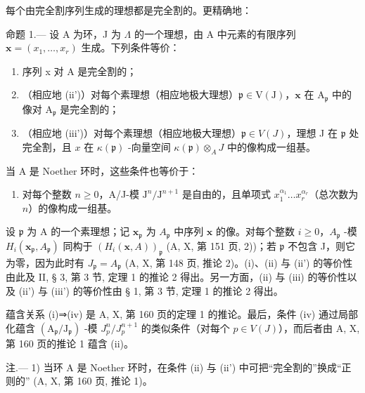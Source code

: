每个由完全割序列生成的理想都是完全割的。更精确地：

命题 1.--- 设 A 为环，J 为 \(\Lambda\) 的一个理想，由 A 中元素的有限序列 \(\mathbf{x} = (x_1, \ldots, x_r)\) 生成。下列条件等价：

\begin{enumerate}
\def\labelenumi{(\roman{enumi})}
\item
  序列 x 对 A 是完全割的；
\item
  （相应地 (ii')）对每个素理想（相应地极大理想）\(\mathfrak{p} \in \mathrm{V}(\mathrm{J})\)，\(\mathbf{x}\) 在 \(\mathrm{A}_{\mathfrak{p}}\) 中的像对 \(\mathrm{A}_{\mathfrak{p}}\) 是完全割的；
\item
  （相应地 (iii')）对每个素理想（相应地极大理想）\(\mathfrak{p} \in V(J)\)，理想 J 在 \(\mathfrak{p}\) 处完全割，且 \(x\) 在 \(\kappa(\mathfrak{p})\) -向量空间 \(\kappa(\mathfrak{p}) \otimes_{A} J\) 中的像构成一组基。
\end{enumerate}

当 A 是 Noether 环时，这些条件也等价于：

\begin{enumerate}
\def\labelenumi{(\roman{enumi})}
\setcounter{enumi}{3}
\tightlist
\item
  对每个整数 \(n \geqslant 0\)，A/J-模 \(\mathrm{J}^n/\mathrm{J}^{n+1}\) 是自由的，且单项式 \(x_1^{\alpha_1} \ldots x_r^{\alpha_r}\)（总次数为 \(n\)）的像构成一组基。
\end{enumerate}

设 \(\mathfrak{p}\) 为 A 的一个素理想；记 \(\mathbf{x}_{\mathfrak{p}}\) 为 \(A_{\mathfrak{p}}\) 中序列 \(\mathbf{x}\) 的像。对每个整数 \(i \geqslant 0\)，\(A_{\mathfrak{p}}\) -模 \(H_i(\mathbf{x}_{\mathfrak{p}}, A_{\mathfrak{p}})\) 同构于 \((H_i(\mathbf{x}, A))_{\mathfrak{p}}\) (A, X, 第 151 页, 2))；若 \(\mathfrak{p}\) 不包含 J，则它为零，因为此时有 \(J_{\mathfrak{p}} = A_{\mathfrak{p}}\) (A, X, 第 148 页, 推论 2)。(i)、(ii) 与 (ii') 的等价性由此及 II, § 3, 第 3 节, 定理 1 的推论 2 得出。另一方面，(ii) 与 (iii) 的等价性以及 (ii') 与 (iii') 的等价性由 § 1, 第 3 节, 定理 1 的推论 2 得出。

蕴含关系 (i)⇒(iv) 是 A, X, 第 160 页的定理 1 的推论。最后，条件 (iv) 通过局部化蕴含 \((\mathrm{A}_{\mathfrak{p}}/\mathrm{J}_{\mathfrak{p}})\) -模 \(J_{p}^{n}/J_{p}^{n+1}\) 的类似条件（对每个 \(p \in V(J)\)），而后者由 A, X, 第 160 页的推论 1 蕴含 (ii)。

注.--- 1) 当环 A 是 Noether 环时，在条件 (ii) 与 (ii') 中可把“完全割的”换成“正则的” (A, X, 第 160 页, 推论 1)。

